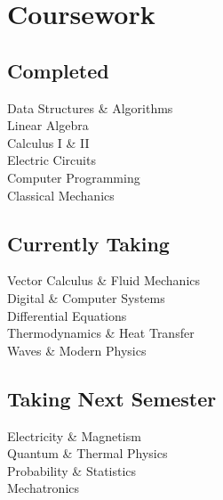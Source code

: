 \begin{minipage}[t]{0.33\textwidth}
\sectionspace %

\section{Coursework}
\subsection{Completed}
Data Structures \& Algorithms \\
Linear Algebra \\
Calculus I \& II\\
Electric Circuits \\
Computer Programming \\
Classical Mechanics \\
\sectionspace %

\subsection{Currently Taking}
Vector Calculus \& Fluid Mechanics \\
Digital \& Computer Systems\\
Differential Equations \\
Thermodynamics \& Heat Transfer \\
Waves \& Modern Physics \\
\sectionspace %

\subsection{Taking Next Semester}
Electricity \& Magnetism \\
Quantum \& Thermal Physics \\
Probability \& Statistics \\
Mechatronics \\
\sectionspace %

\end{minipage} %
\hfill
%
%
